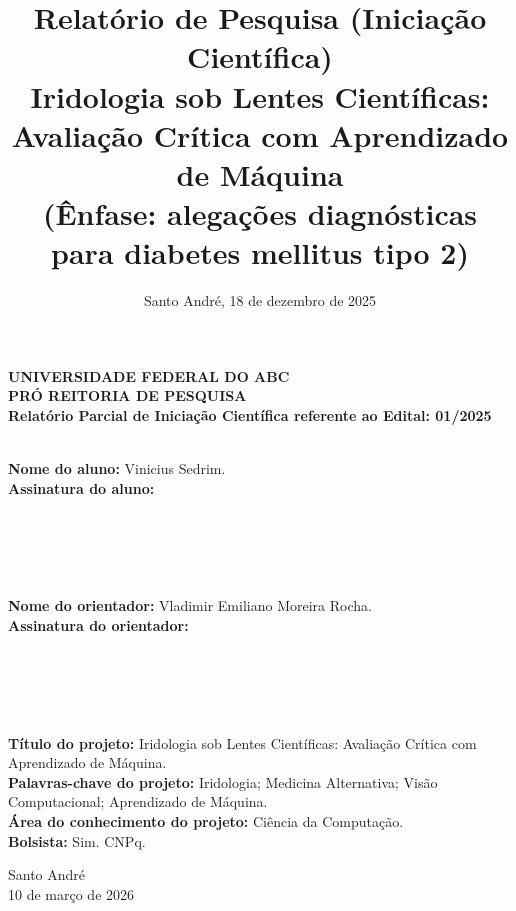 \documentclass[12pt,a4paper]{article}
\title{\textbf{Relatório de Pesquisa (Iniciação Científica)}\\
\large Iridologia sob Lentes Científicas: Avaliação Crítica com Aprendizado de Máquina\\
\vspace{0.2cm}\normalsize (Ênfase: alegações diagnósticas para diabetes mellitus tipo 2)}
\date{Santo André, 18 de dezembro de 2025}
\begin{document}
\hypersetup{pageanchor=false}

\begin{titlepage}
\begin{center}

{\large \textbf{UNIVERSIDADE FEDERAL DO ABC}}\\[0.25cm]
{\large \textbf{PRÓ REITORIA DE PESQUISA}}\\[1.2cm]

{\normalsize \textbf{Relatório Parcial de Iniciação Científica referente ao Edital: 01/2025}}\\[0.6cm]
\end{center}
\\
\textbf{Nome do aluno:} Vinicius Sedrim. \\
\textbf{Assinatura do aluno:}\\\\\\\\\\\\
\textbf{Nome do orientador:} Vladimir Emiliano Moreira Rocha. \\
\textbf{Assinatura do orientador:} \\\\\\\\\\\\
\textbf{Título do projeto:} Iridologia sob Lentes Científicas: Avaliação Crítica com Aprendizado de Máquina. \\
\textbf{Palavras-chave do projeto:} Iridologia; Medicina Alternativa; Visão Computacional; Aprendizado de Máquina. \\
\textbf{Área do conhecimento do projeto:} Ciência da Computação. \\
\textbf{Bolsista:} Sim. CNPq. \\

\begin{center}
\vfill
{\normalsize Santo André}\\
{\normalsize 10 de março de 2026}

\end{center}
\end{titlepage}
\end{document}
